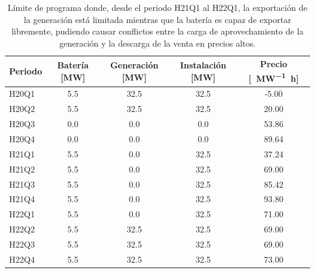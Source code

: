 \begin{table}[ht]
  \centering
  \begin{tabular}{|l|S|S|S|S|}
    \hline
    Periodo & {Batería [\si{\mega\watt}]}  & {Generación [\si{\mega\watt}]}  & {Instalación [\si{\mega\watt}]}  & {Precio [\si{\text{\euro}\per\mega\watt\hour}]} \\
    \hline
    H20Q1   & 5.5                          & 32.5                            & 32.5                             & -5.00                                           \\
    H20Q2   & 5.5                          & 32.5                            & 32.5                             & 20.00                                           \\
    H20Q3   & 0.0                          &  0.0                            &  0.0                             & 53.86                                           \\
    H20Q4   & 0.0                          &  0.0                            &  0.0                             & 89.64                                           \\
    H21Q1   & 5.5                          &  0.0                            & 32.5                             & 37.24                                           \\
    H21Q2   & 5.5                          &  0.0                            & 32.5                             & 69.00                                           \\
    H21Q3   & 5.5                          &  0.0                            & 32.5                             & 85.42                                           \\
    H21Q4   & 5.5                          &  0.0                            & 32.5                             & 93.80                                           \\
    H22Q1   & 5.5                          &  0.0                            & 32.5                             & 71.00                                           \\
    H22Q2   & 5.5                          & 32.5                            & 32.5                             & 69.00                                           \\
    H22Q3   & 5.5                          & 32.5                            & 32.5                             & 69.00                                           \\
    H22Q4   & 5.5                          & 32.5                            & 32.5                             & 73.00                                           \\
    \hline
  \end{tabular}
  \caption[Límites de programa y conflictos en la exportación.]{Límite de programa donde, desde el periodo H21Q1 al H22Q1, la exportación de la generación está limitada mientras que la batería es capaz de exportar libremente, pudiendo causar conflictos entre la carga de aprovechamiento de la generación y la descarga de la venta en precios altos.}%
  \label{tab:carga-descarga-simultanea}
\end{table}

